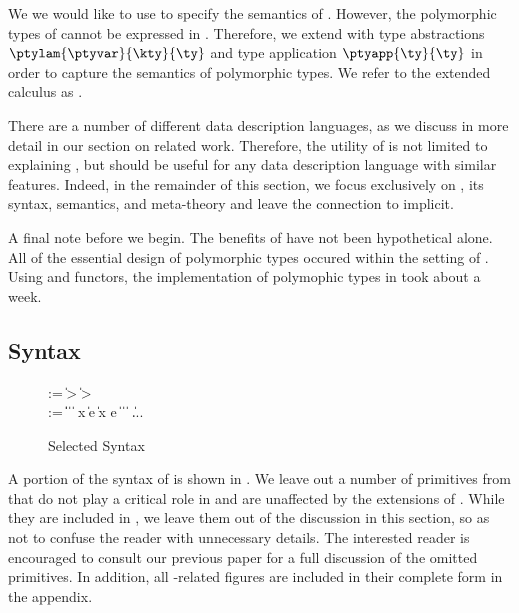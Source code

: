 We we would like to use \ddcold{} to specify the semantics of
\padsml{}. However, the polymorphic types of \padsml{} cannot be
expressed in \ddcold{}. Therefore, we extend \ddcold{} with type
abstractions $\ptylam{\ptyvar}{\kty}{\ty}$ and type application
$\ptyapp{\ty}{\ty}$ in order to capture the semantics of polymorphic
types. We refer to the extended calculus as \ddc{}.

There are a number of different data description languages, as we
discuss in more detail in our section on related work. Therefore, the
utility of \ddc{} is not limited to explaining \padsml{}, but should
be useful for any data description language with similar features.
Indeed, in the remainder of this section, we focus exclusively on
\ddc{}, its syntax, semantics, and meta-theory and leave the
connection to \padsml{} implicit.

A final note before we begin. The benefits of \ddc{} have not been
hypothetical alone. All of the essential design of polymorphic types
occured within the setting of \ddc{}. Using \ddc{} and \ocaml{} functors,
the implementation of polymophic types in \padsml{} took about a week.

\subsection{\ddc{} Syntax}
\begin{figure}
{\small
\begin{bnf}
   \meta{\gk} \::= \kty \| \ity \-> \gk 
                               \| \kty \-> \gk \\
   \meta{\ty} \::= 
    \ptrue\| \pfalse \|  \| 
    \plam{\var}{\ity}{\ty} \|  \nlalt
    \psig x \ty \ty \| \psum \ty e \ty \|
    \pset x \ty e \nlalt
    \ptyvar \| \pmu{\ptyvar}{\gk}{\ty} \| 
    \ptylam{\ptyvar}{\kty}{\ty} \| \ptyapp{\ty}{\ty} \| ...
\end{bnf}
}
\caption{Selected \ddc{} Syntax}
\label{fig:ddc-syntax}
\end{figure}

A portion of the syntax of \ddc{} is shown in .
We leave out a number of primitives from \ddcold{} that do not play a
critical role in \padsml{} and are unaffected by the extensions of
\ddc{}. While they are included in \ddc{}, we leave them out of the
discussion in this section, so as not to confuse the reader with
unnecessary details. The interested reader is encouraged to consult
our previous paper for a full discussion of the omitted primitives. In
addition, all \ddc{}-related figures are included in their complete
form in the appendix.

